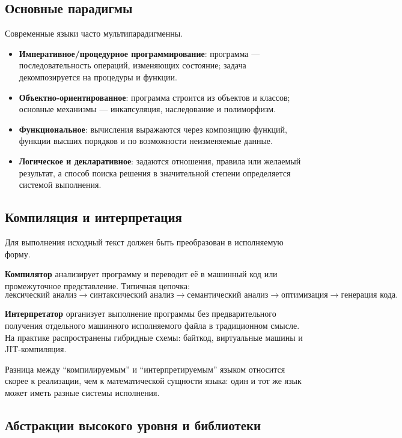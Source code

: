 \subsection{Основные парадигмы}

Современные языки часто мультипарадигменны.

\begin{itemize}
\item \textbf{Императивное/процедурное программирование}: программа --- последовательность операций, изменяющих состояние; задача декомпозируется на процедуры и функции.
\item \textbf{Объектно-ориентированное}: программа строится из объектов и классов; основные механизмы --- инкапсуляция, наследование и полиморфизм.
\item \textbf{Функциональное}: вычисления выражаются через композицию функций, функции высших порядков и по возможности неизменяемые данные.
\item \textbf{Логическое и декларативное}: задаются отношения, правила или желаемый результат, а способ поиска решения в значительной степени определяется системой выполнения.
\end{itemize}

\subsection{Компиляция и интерпретация}

Для выполнения исходный текст должен быть преобразован в исполняемую форму.

\textbf{Компилятор} анализирует программу и переводит её в машинный код или промежуточное представление. Типичная цепочка:
\[
\text{лексический анализ}
\rightarrow
\text{синтаксический анализ}
\rightarrow
\text{семантический анализ}
\rightarrow
\text{оптимизация}
\rightarrow
\text{генерация кода}.
\]

\textbf{Интерпретатор} организует выполнение программы без предварительного получения отдельного машинного исполняемого файла в традиционном смысле. На практике распространены гибридные схемы: байткод, виртуальные машины и JIT-компиляция.

Разница между ``компилируемым'' и ``интерпретируемым'' языком относится скорее к реализации, чем к математической сущности языка: один и тот же язык может иметь разные системы исполнения.

\subsection{Абстракции высокого уровня и библиотеки}

